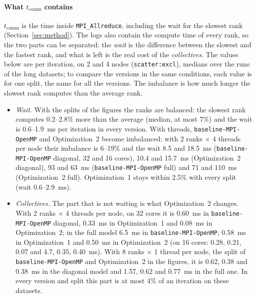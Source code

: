 \documentclass[conference,onecolumn]{IEEEtran}
\newcommand{\vbase}{\texttt{baseline-\allowbreak MPI-\allowbreak OpenMP}}
\begin{document}
\paragraph{What $t_{\mathrm{comm}}$ contains} $t_{\mathrm{comm}}$ is the time inside \texttt{MPI\_Allreduce}, including the wait for the slowest rank (Section~\ref{sec:method}). The logs also contain the compute time of every rank, so the two parts can be separated: the \emph{wait} is the difference between the slowest and the fastest rank, and what is left is the real cost of the \emph{collectives}. The values below are per iteration, on 2 and 4 nodes (\texttt{scatter:excl}), medians over the runs of the long datasets; to compare the versions in the same conditions, each value is for one split, the same for all the versions. The imbalance is how much longer the slowest rank computes than the average rank.
\begin{itemize}
\item \emph{Wait.} With the splits of the figures the ranks are balanced: the slowest rank computes 0.2--2.8\% more than the average (median, at most 7\%) and the wait is 0.6--1.9~ms per iteration in every version. With threads, \vbase{} and Optimization~2 become imbalanced: with 2 ranks $\times$ 4 threads per node their imbalance is 6--19\% and the wait 8.5 and 18.5~ms (\vbase{} diagonal, 32 and 16 cores), 10.4 and 15.7~ms (Optimization~2 diagonal), 93 and 63~ms (\vbase{} full) and 71 and 110~ms (Optimization~2 full). Optimization~1 stays within 2.5\% with every split (wait 0.6--2.9~ms).
\item \emph{Collectives.} The part that is not waiting is what Optimization~2 changes. With 2 ranks $\times$ 4 threads per node, on 32 cores it is 0.60~ms in \vbase{} diagonal, 0.33~ms in Optimization~1 and 0.08~ms in Optimization~2; in the full model 6.5~ms in \vbase{}, 0.58~ms in Optimization~1 and 0.50~ms in Optimization~2 (on 16 cores: 0.28, 0.21, 0.07 and 4.7, 0.35, 0.40~ms). With 8 ranks $\times$ 1 thread per node, the split of \vbase{} and Optimization~2 in the figures, it is 0.62, 0.38 and 0.38~ms in the diagonal model and 1.57, 0.62 and 0.77~ms in the full one. In every version and split this part is at most 4\% of an iteration on these datasets.
\end{itemize}
\end{document}
